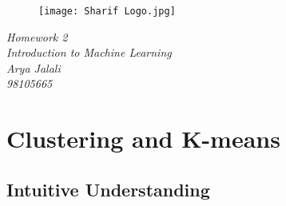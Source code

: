 \documentclass[12pt,onecolumn,a4paper]{article}
\begin{document}
	\begin{titlepage}
		\begin{figure}[H]
			\centering
			\texttt{[image: Sharif Logo.jpg]}
			\label{fig:my_label}
		\end{figure}
		\begin{center}
			\large\textit{
				Homework 2 \\
				Introduction to Machine Learning\\
				}
			\large\textit{Arya Jalali}\\
			\large\textit{98105665}
		\end{center}
	\end{titlepage}
	
	\newpage


\section{Clustering and K-means}
\subsection{Intuitive Understanding}
\end{document}
